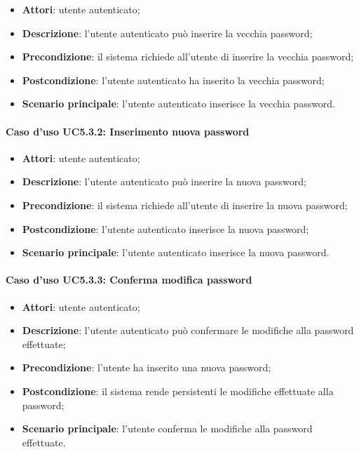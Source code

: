 \begin{itemize}
	\item \textbf{Attori}: utente autenticato;
	\item \textbf{Descrizione}: l'utente autenticato può inserire la vecchia password;
	\item \textbf{Precondizione}: il sistema richiede all'utente di inserire la vecchia password;
	\item \textbf{Postcondizione}: l'utente autenticato ha inserito la vecchia password;
	\item \textbf{Scenario principale}: l'utente autenticato inserisce la vecchia password.
\end{itemize}

\paragraph{Caso d'uso UC5.3.2: Inserimento nuova password}

\begin{itemize}
	\item \textbf{Attori}: utente autenticato;
	\item \textbf{Descrizione}: l'utente autenticato può inserire la nuova password;
	\item \textbf{Precondizione}: il sistema richiede all'utente di inserire la nuova password;
	\item \textbf{Postcondizione}: l'utente autenticato inserisce la nuova password;
	\item \textbf{Scenario principale}: l'utente autenticato inserisce la nuova password.
\end{itemize}

\paragraph{Caso d'uso UC5.3.3: Conferma modifica password}

\begin{itemize}
	\item \textbf{Attori}: utente autenticato;
	\item \textbf{Descrizione}: l'utente autenticato può confermare le modifiche alla password effettuate;
	\item \textbf{Precondizione}: l'utente ha inserito una nuova password;
	\item \textbf{Postcondizione}: il sistema rende persistenti le modifiche effettuate alla password;
	\item \textbf{Scenario principale}: l'utente conferma le modifiche alla password effettuate.
\end{itemize}

